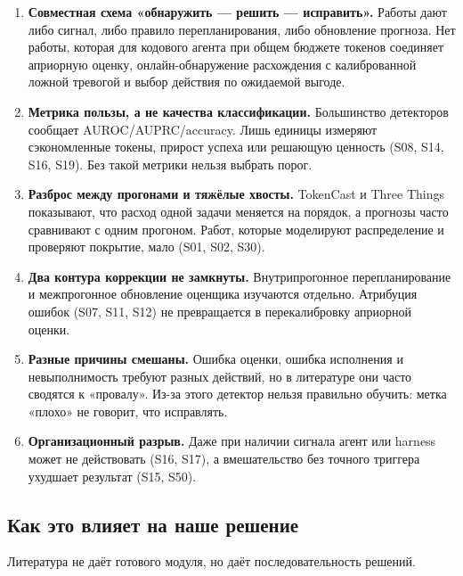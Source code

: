 \documentclass[11pt,a4paper]{article}
\begin{document}
\begin{enumerate}
  \item \textbf{Совместная схема «обнаружить — решить — исправить».} Работы
        дают либо сигнал, либо правило перепланирования, либо обновление
        прогноза. Нет работы, которая для кодового агента при общем бюджете
        токенов соединяет априорную оценку, онлайн-обнаружение расхождения
        с калиброванной ложной тревогой и выбор действия по ожидаемой
        выгоде.
  \item \textbf{Метрика пользы, а не качества классификации.} Большинство
        детекторов сообщает AUROC/AUPRC/accuracy. Лишь единицы измеряют
        сэкономленные токены, прирост успеха или решающую ценность
        (S08, S14, S16, S19). Без такой метрики нельзя выбрать порог.
  \item \textbf{Разброс между прогонами и тяжёлые хвосты.} TokenCast и
        Three Things показывают, что расход одной задачи меняется на
        порядок, а прогнозы часто сравнивают с одним прогоном. Работ,
        которые моделируют распределение и проверяют покрытие, мало
        (S01, S02, S30).
  \item \textbf{Два контура коррекции не замкнуты.} Внутрипрогонное
        перепланирование и межпрогонное обновление оценщика изучаются
        отдельно. Атрибуция ошибок (S07, S11, S12) не превращается в
        перекалибровку априорной оценки.
  \item \textbf{Разные причины смешаны.} Ошибка оценки, ошибка исполнения
        и невыполнимость требуют разных действий, но в литературе они
        часто сводятся к «провалу». Из-за этого детектор нельзя правильно
        обучить: метка «плохо» не говорит, что исправлять.
  \item \textbf{Организационный разрыв.} Даже при наличии сигнала агент
        или harness может не действовать (S16, S17), а вмешательство без
        точного триггера ухудшает результат (S15, S50).
\end{enumerate}

\subsection{Как это влияет на наше решение}

Литература не даёт готового модуля, но даёт последовательность решений.
\end{document}

